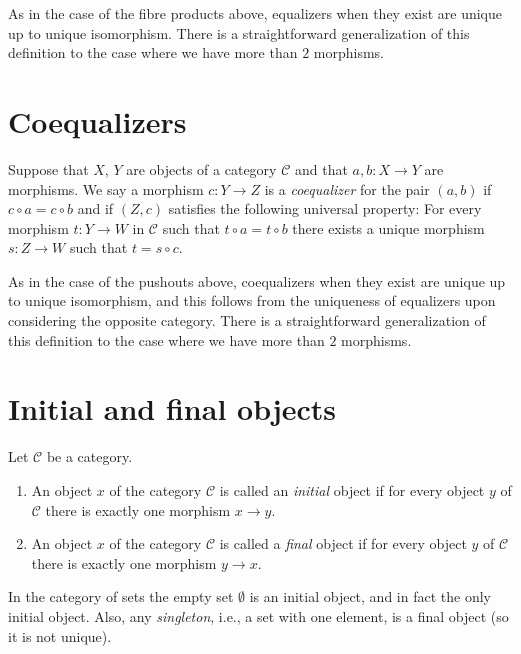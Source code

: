 \noindent
As in the case of the fibre products above, equalizers when
they exist are unique up to unique isomorphism. There is a
straightforward generalization of this definition to the
case where we have more than $2$ morphisms.

\section{Coequalizers}
\label{section-coequalizers}

\begin{definition}
\label{definition-coequalizers}
Suppose that $X$, $Y$ are objects of a category $\mathcal{C}$
and that $a, b : X \to Y$ are morphisms. We say a morphism
$c : Y \to Z$ is a {\it coequalizer} for the pair $(a, b)$ if
$c \circ a = c \circ b$ and if $(Z, c)$ satisfies the following
universal property: For every morphism $t : Y \to W$
in $\mathcal{C}$ such that $t \circ a = t \circ b$ there exists
a unique morphism $s : Z \to W$ such that $t = s \circ c$.
\end{definition}

\noindent
As in the case of the pushouts above, coequalizers when
they exist are unique up to unique isomorphism, and this follows
from the uniqueness of equalizers upon considering the opposite
category. There is a straightforward generalization of this definition
to the case where we have more than $2$ morphisms.

\section{Initial and final objects}
\label{section-initial-final}

\begin{definition}
\label{definition-initial-final}
Let $\mathcal{C}$ be a category.
\begin{enumerate}
\item An object $x$ of the category $\mathcal{C}$ is called
an {\it initial} object if for every object $y$ of $\mathcal{C}$
there is exactly one morphism $x \to y$.
\item An object $x$ of the category $\mathcal{C}$ is called
a {\it final} object if for every object $y$ of $\mathcal{C}$
there is exactly one morphism $y \to x$.
\end{enumerate}
\end{definition}

\noindent
In the category of sets the empty set $\emptyset$ is an
initial object, and in fact the only initial object.
Also, any {\it singleton}, i.e., a set with one element,
is a final object (so it is not unique).




